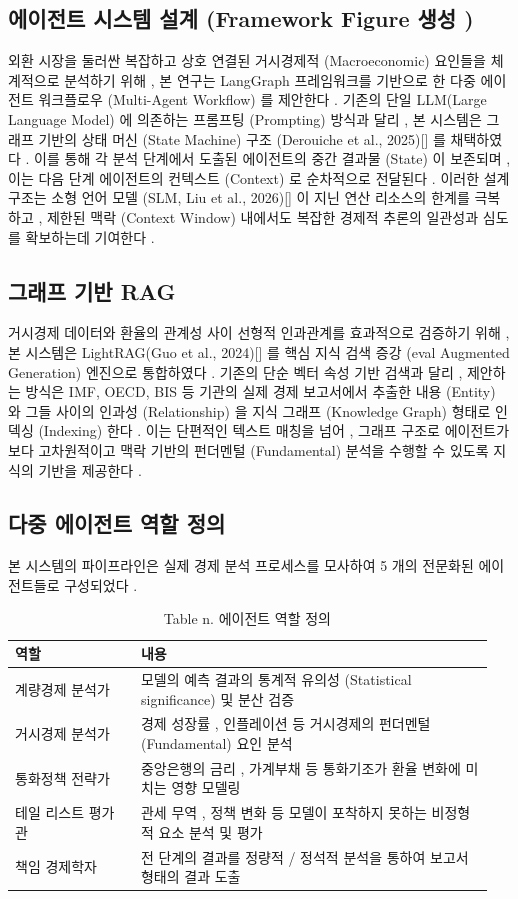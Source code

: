 \documentclass[10pt,a4paper]{article}
\begin{document}
\subsection{에이전트 시스템 설계 (Framework Figure 생성 )}
외환 시장을 둘러싼 복잡하고 상호 연결된 거시경제적 (Macroeconomic) 요인들을 체계적으로 분석하기 위해 , 본 연구는 LangGraph 프레임워크를 기반으로 한 다중 에이전트 워크플로우 (Multi-Agent Workflow) 를 제안한다 . 기존의 단일 LLM(Large Language Model) 에 의존하는 프롬프팅 (Prompting) 방식과 달리 , 본 시스템은 그래프 기반의 상태 머신 (State Machine) 구조 (Derouiche et al., 2025)[] 를 채택하였다 . 이를 통해 각 분석 단계에서 도출된 에이전트의 중간 결과물 (State) 이 보존되며 , 이는 다음 단계 에이전트의 컨텍스트 (Context) 로 순차적으로 전달된다 . 이러한 설계 구조는 소형 언어 모델 (SLM, Liu et al., 2026)[] 이 지닌 연산 리소스의 한계를 극복하고 , 제한된 맥락 (Context Window) 내에서도 복잡한 경제적 추론의 일관성과 심도를 확보하는데 기여한다 .

\subsection{그래프 기반 RAG}
거시경제 데이터와 환율의 관계성 사이 선형적 인과관계를 효과적으로 검증하기 위해 , 본 시스템은 LightRAG(Guo et al., 2024)[] 를 핵심 지식 검색 증강 (eval Augmented Generation) 엔진으로 통합하였다 . 기존의 단순 벡터 속성 기반 검색과 달리 , 제안하는 방식은 IMF, OECD, BIS 등 기관의 실제 경제 보고서에서 추출한 내용 (Entity) 와 그들 사이의 인과성 (Relationship) 을 지식 그래프 (Knowledge Graph) 형태로 인덱싱 (Indexing) 한다 . 이는 단편적인 텍스트 매칭을 넘어 , 그래프 구조로 에이전트가 보다 고차원적이고 맥락 기반의 펀더멘털 (Fundamental) 분석을 수행할 수 있도록 지식의 기반을 제공한다 .

\subsection{다중 에이전트 역할 정의}
본 시스템의 파이프라인은 실제 경제 분석 프로세스를 모사하여 5 개의 전문화된 에이전트들로 구성되었다 .

\begingroup\small
\begin{table}[t]
\centering
\caption{Table n. 에이전트 역할 정의}
\begin{tabular}{|p{0.25\linewidth}|p{0.70\linewidth}|}
\hline
 역할 & 내용 \\
\hline
 계량경제 분석가 & 모델의 예측 결과의 통계적 유의성 (Statistical significance) 및 분산 검증 \\
\hline
 거시경제 분석가 & 경제 성장률 , 인플레이션 등 거시경제의 펀더멘털 (Fundamental) 요인 분석 \\
\hline
 통화정책 전략가 & 중앙은행의 금리 , 가계부채 등 통화기조가 환율 변화에 미치는 영향 모델링 \\
\hline
 테일 리스트 평가관 & 관세 무역 , 정책 변화 등 모델이 포착하지 못하는 비정형적 요소 분석 및 평가 \\
\hline
 책임 경제학자 & 전 단계의 결과를 정량적 / 정석적 분석을 통하여 보고서형태의 결과 도출 \\
\hline
\end{tabular}
\end{table}
\endgroup
\end{document}
